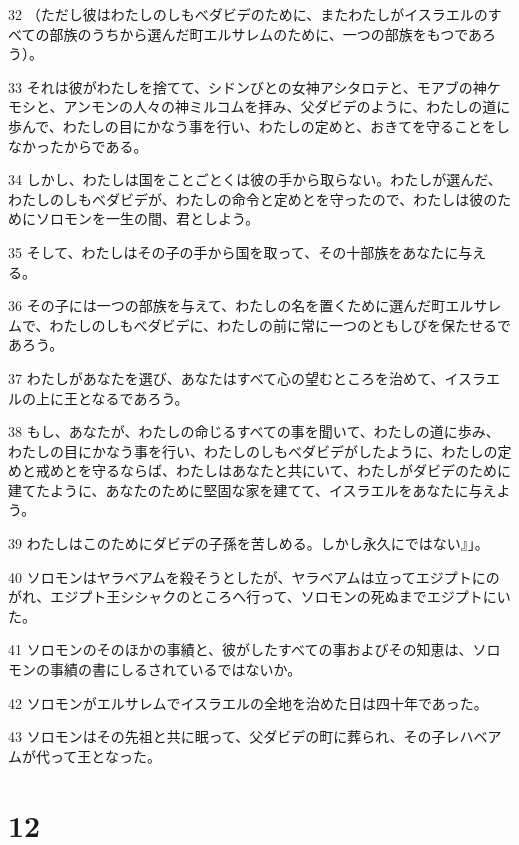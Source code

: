 \par 32 （ただし彼はわたしのしもべダビデのために、またわたしがイスラエルのすべての部族のうちから選んだ町エルサレムのために、一つの部族をもつであろう）。
\par 33 それは彼がわたしを捨てて、シドンびとの女神アシタロテと、モアブの神ケモシと、アンモンの人々の神ミルコムを拝み、父ダビデのように、わたしの道に歩んで、わたしの目にかなう事を行い、わたしの定めと、おきてを守ることをしなかったからである。
\par 34 しかし、わたしは国をことごとくは彼の手から取らない。わたしが選んだ、わたしのしもべダビデが、わたしの命令と定めとを守ったので、わたしは彼のためにソロモンを一生の間、君としよう。
\par 35 そして、わたしはその子の手から国を取って、その十部族をあなたに与える。
\par 36 その子には一つの部族を与えて、わたしの名を置くために選んだ町エルサレムで、わたしのしもべダビデに、わたしの前に常に一つのともしびを保たせるであろう。
\par 37 わたしがあなたを選び、あなたはすべて心の望むところを治めて、イスラエルの上に王となるであろう。
\par 38 もし、あなたが、わたしの命じるすべての事を聞いて、わたしの道に歩み、わたしの目にかなう事を行い、わたしのしもべダビデがしたように、わたしの定めと戒めとを守るならば、わたしはあなたと共にいて、わたしがダビデのために建てたように、あなたのために堅固な家を建てて、イスラエルをあなたに与えよう。
\par 39 わたしはこのためにダビデの子孫を苦しめる。しかし永久にではない』」。
\par 40 ソロモンはヤラベアムを殺そうとしたが、ヤラベアムは立ってエジプトにのがれ、エジプト王シシャクのところへ行って、ソロモンの死ぬまでエジプトにいた。
\par 41 ソロモンのそのほかの事績と、彼がしたすべての事およびその知恵は、ソロモンの事績の書にしるされているではないか。
\par 42 ソロモンがエルサレムでイスラエルの全地を治めた日は四十年であった。
\par 43 ソロモンはその先祖と共に眠って、父ダビデの町に葬られ、その子レハベアムが代って王となった。

\chapter{12}

